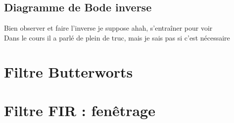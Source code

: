 \documentclass{article}
\theoremstyle{plain}%
\theoremstyle{definition}
\theoremstyle{remark}
\begin{document}
\subsection{Diagramme de Bode inverse }
Bien observer et faire l'inverse je suppose ahah, s'entraîner pour voir \\
Dans le cours il a parlé de plein de truc, mais je sais pas si c'est nécessaire

\section{Filtre Butterworts}


\section{Filtre FIR : fenêtrage}
\end{document}
